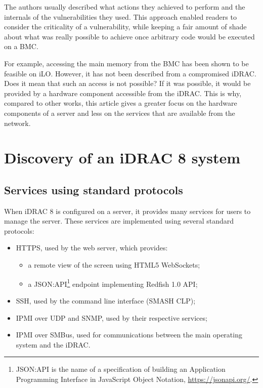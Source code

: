 The authors usually described what actions they achieved to perform and the internals of the vulnerabilities they used.
This approach enabled readers to consider the criticality of a vulnerability, while keeping a fair amount of shade about what was really possible to achieve once arbitrary code would be executed on a BMC.

For example, accessing the main memory from the BMC has been shown to be feasible on iLO.
However, it has not been described from a compromised iDRAC.
Does it mean that such an access is not possible?
If it was possible, it would be provided by a hardware component accessible from the iDRAC.
This is why, compared to other works, this article gives a greater focus on the hardware components of a server and less on the services that are available from the network.



\section{Discovery of an iDRAC 8 system}

\subsection{Services using standard protocols}

When iDRAC 8 is configured on a server, it provides many services for users to manage the server.
These services are implemented using several standard protocols:
\begin{itemize}
  \item HTTPS, used by the web server, which provides:
    \begin{itemize}
      \item a remote view of the screen using HTML5 WebSockets;
      \item a JSON:API\footnote{JSON:API is the name of a specification of building an Application Programming Interface in JavaScript Object Notation, \url{https://jsonapi.org/}.} endpoint implementing Redfish 1.0 API;
    \end{itemize}
  \item SSH, used by the command line interface (SMASH CLP);
  \item IPMI over UDP and SNMP, used by their respective services;
  \item IPMI over SMBus, used for communications between the main operating system and the iDRAC.
\end{itemize}

